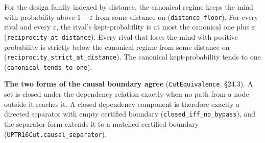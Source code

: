 \documentclass[
]{article}
\begin{document}
For the design family indexed by distance, the canonical regime keeps
the mind with probability above \(1-\varepsilon\) from some distance on
(\texttt{distance\_floor}). For every rival and every \(\varepsilon\),
the rival's kept-probability is at most the canonical one plus
\(\varepsilon\)
(\texttt{r\allowbreak{}e\allowbreak{}c\allowbreak{}i\allowbreak{}p\allowbreak{}r\allowbreak{}o\allowbreak{}c\allowbreak{}i\allowbreak{}t\allowbreak{}y\allowbreak{}\_\allowbreak{}a\allowbreak{}t\allowbreak{}\_\allowbreak{}d\allowbreak{}i\allowbreak{}s\allowbreak{}t\allowbreak{}a\allowbreak{}n\allowbreak{}c\allowbreak{}e}).
Every rival that loses the mind with positive probability is strictly
below the canonical regime from some distance on
(\texttt{r\allowbreak{}e\allowbreak{}c\allowbreak{}i\allowbreak{}p\allowbreak{}r\allowbreak{}o\allowbreak{}c\allowbreak{}i\allowbreak{}t\allowbreak{}y\allowbreak{}\_\allowbreak{}s\allowbreak{}t\allowbreak{}r\allowbreak{}i\allowbreak{}c\allowbreak{}t\allowbreak{}\_\allowbreak{}a\allowbreak{}t\allowbreak{}\_\allowbreak{}d\allowbreak{}i\allowbreak{}s\allowbreak{}t\allowbreak{}a\allowbreak{}n\allowbreak{}c\allowbreak{}e}).
The canonical kept-probability tends to one
(\texttt{c\allowbreak{}a\allowbreak{}n\allowbreak{}o\allowbreak{}n\allowbreak{}i\allowbreak{}c\allowbreak{}a\allowbreak{}l\allowbreak{}\_\allowbreak{}t\allowbreak{}e\allowbreak{}n\allowbreak{}d\allowbreak{}s\allowbreak{}\_\allowbreak{}t\allowbreak{}o\allowbreak{}\_\allowbreak{}o\allowbreak{}n\allowbreak{}e}).

\textbf{The two forms of the causal boundary agree}
(\texttt{CutEquivalence}, §24.3). A set is closed under the dependency
relation exactly when no path from a node outside it reaches it. A
closed dependency component is therefore exactly a directed separator
with empty certified boundary
(\texttt{c\allowbreak{}l\allowbreak{}o\allowbreak{}s\allowbreak{}e\allowbreak{}d\allowbreak{}\_\allowbreak{}i\allowbreak{}f\allowbreak{}f\allowbreak{}\_\allowbreak{}n\allowbreak{}o\allowbreak{}\_\allowbreak{}b\allowbreak{}y\allowbreak{}p\allowbreak{}a\allowbreak{}s\allowbreak{}s}),
and the separator form extends it to a matched certified boundary
(\texttt{U\allowbreak{}P\allowbreak{}T\allowbreak{}R\allowbreak{}1\allowbreak{}6\allowbreak{}C\allowbreak{}u\allowbreak{}t\allowbreak{}.\allowbreak{}c\allowbreak{}a\allowbreak{}u\allowbreak{}s\allowbreak{}a\allowbreak{}l\allowbreak{}\_\allowbreak{}s\allowbreak{}e\allowbreak{}p\allowbreak{}a\allowbreak{}r\allowbreak{}a\allowbreak{}t\allowbreak{}o\allowbreak{}r}).
\end{document}
